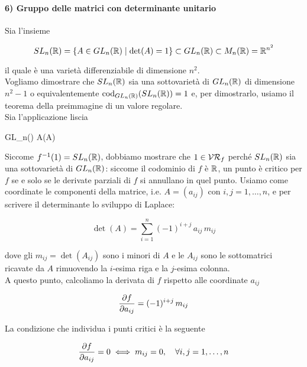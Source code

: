 \paragraph{6) Gruppo delle matrici con determinante unitario}\label{example:sl-subman}

Sia l'insieme

\begin{equation}
	SL_{n}(\mathbb{R}) = \{ A \in GL_{n}(\mathbb{R}) \mid \det(A) = 1 \} \subset GL_{n}(\mathbb{R}) \subset M_{n}(\mathbb{R}) = \mathbb{R}^{n^{2}}
\end{equation}

il quale è una varietà differenziabile di dimensione $ n^{2} $. \\
Vogliamo dimostrare che $ SL_{n}(\mathbb{R}) $ sia una sottovarietà di $ GL_{n}(\mathbb{R}) $ di dimensione $ n^{2}-1 $ o equivalentemente $ \operatorname{cod}_{GL_{n}(\mathbb{R})}(SL_{n}(\mathbb{R})) = 1 $ e, per dimostrarlo, usiamo il teorema della preimmagine di un valore regolare. \\
Sia l'applicazione liscia

	{GL_{n}(\R)}{\R}
	{A}{\det(A)}

Siccome $ f^{-1}(1) = SL_{n}(\mathbb{R}) $, dobbiamo mostrare che $ 1 \in \mathcal{VR}_{f} $ perché $ SL_{n}(\mathbb{R}) $ sia una sottovarietà di $ GL_{n}(\mathbb{R}) $: siccome il codominio di $ f $ è $ \mathbb{R} $, un punto è critico per $ f $ se e solo se le derivate parziali di $ f $ si annullano in quel punto. Usiamo come coordinate le componenti della matrice, i.e. $ A = (a_{ij}) $ con $ i,j=1,\dots,n $, e per scrivere il determinante lo sviluppo di Laplace:

\begin{equation}
	\det(A) = \sum_{i=1}^{n} (-1)^{i+j} \, a_{ij} \, m_{ij}
\end{equation}

dove gli $ m_{ij} = \det(A_{ij}) $ sono i minori di $ A $ e le $ A_{ij} $ sono le sottomatrici ricavate da $ A $ rimuovendo la $ i $-esima riga e la $ j $-esima colonna. \\
A questo punto, calcoliamo la derivata di $ f $ rispetto alle coordinate $ a_{ij} $

\begin{equation}
	\pdv{f}{a_{ij}} = (-1)^{i+j} \, m_{ij}
\end{equation}

La condizione che individua i punti critici è la seguente

\begin{align}
	\pdv{f}{a_{ij}} = 0 \iff m_{ij} = 0 \qcomma \forall i,j=1,\dots,n
\end{align}

